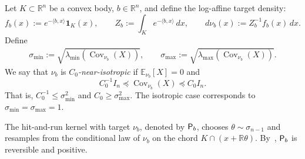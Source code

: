 \documentclass[11pt]{article}
\theoremstyle{definition}
\theoremstyle{remark}
\newcommand{\E}{\mathbb E}
\newcommand{\R}{\mathbb R}
\newcommand{\cQ}{\mathcal Q}
\newcommand{\one}{\mathbf 1}
\begin{document}
Let $K\subset\R^n$ be a convex body,  $b\in\R^n$, and define the log-affine target density:
\begin{equation}\label{eq:log-affine-target}
 f_b(x):=e^{-\langle b,x\rangle}\one_K(x),
 \qquad
 Z_b:=\int_K e^{-\langle b,x\rangle}\,dx,
 \qquad
 d\nu_b(x):=Z_b^{-1}f_b(x)\,dx.
\end{equation}
Define
\begin{align*}
    \sigma_{\min}:=\sqrt{\lambda_{\min}(\operatorname{Cov}_{\nu_b}(X))},\qquad \sigma_{\max}:=\sqrt{\lambda_{\max}(\operatorname{Cov}_{\nu_b}(X))}.
\end{align*}
We say that $\nu_b$ is \emph{$C_0$-near-isotropic} if $\E_{\nu_b}[X]=0$ and
\begin{equation}\label{eq:log-affine-near-isotropic}
 C_0^{-1}I_n
 \preceq
 \operatorname{Cov}_{\nu_b}(X)
 \preceq
 C_0 I_n.
\end{equation}
That is, $C_0^{-1}\leq \sigma_{\min}^2$ and $C_0\geq \sigma_{\max}^2$.
The isotropic case corresponds to $\sigma_{\min}=\sigma_{\max}=1$.

The hit-and-run kernel with target $\nu_b$, denoted by ${\sf P}_b$, chooses $\theta\sim\sigma_{n-1}$ and resamples from the conditional law of $\nu_b$ on the chord $K\cap(x+\R\theta)$. By~\cite{RudolfUllrichPositivity}, ${\sf P}_b$ is reversible and positive.    

\end{document}
